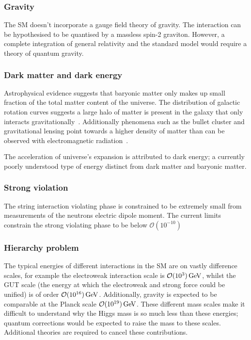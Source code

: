 \subsubsection{Gravity}
The SM doesn't incorporate a gauge field theory of gravity. The interaction can be hypothesised to be quantised by a massless spin-2 graviton. However, a complete integration of general relativity and the standard model would require a theory of quantum gravity. 

\subsubsection{Dark matter and dark energy}
Astrophysical evidence suggests that baryonic matter only makes up small fraction of the total matter content of the universe. 
The distribution of galactic rotation curves suggests a large halo of matter is present in the galaxy that only interacts gravitationally~\cite{DMrotation}. Additionally phenomena such as the bullet cluster and gravitational lensing point towards a higher density of matter than can be observed with electromagnetic radiation~\cite{0004-637X-604-2-596,0004-637X-606-2-819}. 

The acceleration of universe's expansion is attributed to dark energy; a currently poorly understood type of energy distinct from dark matter and baryonic matter.

\subsubsection{Strong \CP violation}  
The string interaction \CP violating phase is constrained to be extremely small from measurements of the neutrons electric dipole moment. The current limits constrain the strong \CP violating phase to be below $\mathcal{O}(10^{-10})$~\cite{Kuckei2007} 

\subsubsection{Hierarchy problem}
The typical energies of different interactions in the SM are on vastly difference scales, for example the electroweak interaction scale is $\mathcal{O}(10^{3})\mathrm{\,Ge\kern -0.1em V}$, whilst the GUT scale (the energy at which the electroweak and strong force could be unified) is of order $\mathcal{O}(10^{16})\mathrm{\,Ge\kern -0.1em V}$. Additionally, gravity is expected to be comparable at the Planck scale $\mathcal{O}(10^{19})\mathrm{\,Ge\kern -0.1em V}$. These different mass scales make it difficult to understand why the Higgs mass is so much less than these energies; quantum corrections would be expected to raise the mass to these scales. Additional theories are required to cancel these contributions. 



